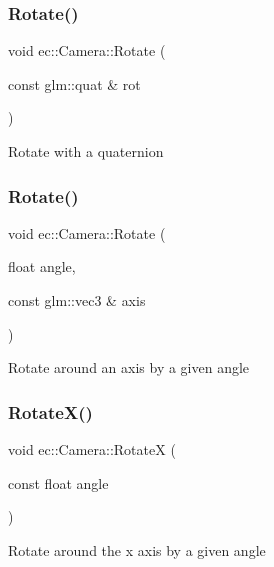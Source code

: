 \subsubsection{\texorpdfstring{Rotate()}{Rotate()}\hspace{0.1cm}{\footnotesize\ttfamily [1/2]}}
{\footnotesize\ttfamily void ec\+::\+Camera\+::\+Rotate (\begin{DoxyParamCaption}\item[{const glm\+::quat \&}]{rot }\end{DoxyParamCaption})}

Rotate with a quaternion \mbox{\label{classec_1_1_camera_a3cfaa2574d9fe5b90f255cf4e8b9fcae}} 
\subsubsection{\texorpdfstring{Rotate()}{Rotate()}\hspace{0.1cm}{\footnotesize\ttfamily [2/2]}}
{\footnotesize\ttfamily void ec\+::\+Camera\+::\+Rotate (\begin{DoxyParamCaption}\item[{float}]{angle,  }\item[{const glm\+::vec3 \&}]{axis }\end{DoxyParamCaption})}

Rotate around an axis by a given angle \mbox{\label{classec_1_1_camera_ac6233a1acdef77bfb7f86d8bf320119d}} 
\subsubsection{\texorpdfstring{Rotate\+X()}{RotateX()}}
{\footnotesize\ttfamily void ec\+::\+Camera\+::\+RotateX (\begin{DoxyParamCaption}\item[{const float}]{angle }\end{DoxyParamCaption})}

Rotate around the x axis by a given angle \mbox{\label{classec_1_1_camera_afc7a198a827b5b35008495ea34ab48b3}} 
